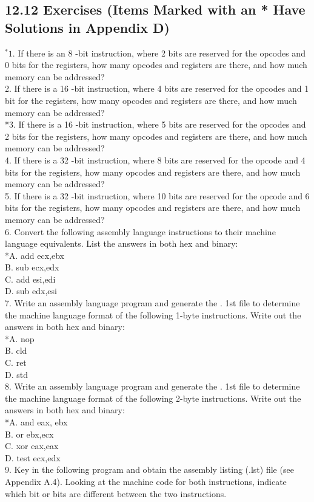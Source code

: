\documentclass[10pt]{book}
\begin{document}
\subsection*{12.12 Exercises (Items Marked with an * Have Solutions in Appendix D)}
${ }^{*} 1$. If there is an 8 -bit instruction, where 2 bits are reserved for the opcodes and 0 bits for the registers, how many opcodes and registers are there, and how much memory can be addressed?\\
2. If there is a 16 -bit instruction, where 4 bits are reserved for the opcodes and 1 bit for the registers, how many opcodes and registers are there, and how much memory can be addressed?\\
*3. If there is a 16 -bit instruction, where 5 bits are reserved for the opcodes and 2 bits for the registers, how many opcodes and registers are there, and how much memory can be addressed?\\
4. If there is a 32 -bit instruction, where 8 bits are reserved for the opcode and 4 bits for the registers, how many opcodes and registers are there, and how much memory can be addressed?\\
5. If there is a 32 -bit instruction, where 10 bits are reserved for the opcode and 6 bits for the registers, how many opcodes and registers are there, and how much memory can be addressed?\\
6. Convert the following assembly language instructions to their machine language equivalents. List the answers in both hex and binary:\\
*A. add ecx,ebx\\
B. sub ecx,edx\\
C. add esi,edi\\
D. sub edx,esi\\
7. Write an assembly language program and generate the . 1st file to determine the machine language format of the following 1-byte instructions. Write out the answers in both hex and binary:\\
*A. nop\\
B. cld\\
C. ret\\
D. std\\
8. Write an assembly language program and generate the . 1st file to determine the machine language format of the following 2-byte instructions. Write out the answers in both hex and binary:\\
*A. and eax, ebx\\
B. or ebx,ecx\\
C. xor eax,eax\\
D. test ecx,edx\\
9. Key in the following program and obtain the assembly listing (.lst) file (see Appendix A.4). Looking at the machine code for both instructions, indicate which bit or bits are different between the two instructions.
\end{document}
